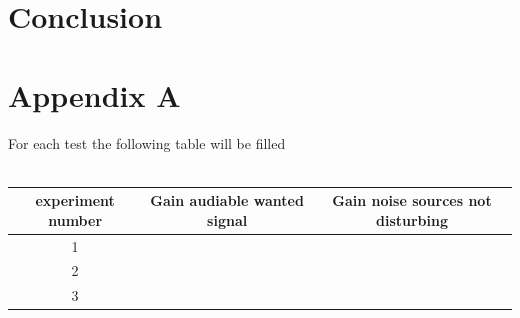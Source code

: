 \documentclass[12pt,a4paper]{article}
\begin{document}
\vspace{1cm}
\section{Conclusion}

\section*{Appendix A}
For each test the following table will be filled \\\\
\begin{tabular}{c  c  c} \toprule
experiment number & Gain audiable wanted signal & Gain noise sources not disturbing  \\ \toprule
1 &  & \\
2 &  & \\
3 &  & \\ \bottomrule
\end{tabular}
\end{document}
